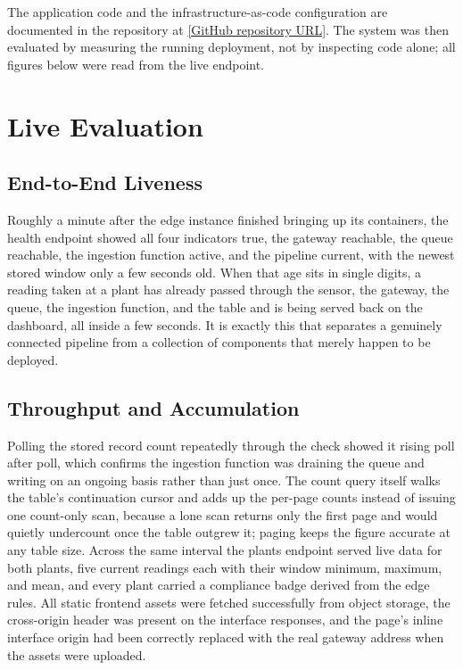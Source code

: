 \documentclass[conference]{IEEEtran}
\begin{document}
The application code and the infrastructure-as-code configuration are documented in the repository at \href{[GitHub repository URL]}{[GitHub repository URL]}. The system was then evaluated by measuring the running deployment, not by inspecting code alone; all figures below were read from the live endpoint.

\section{Live Evaluation}

\subsection{End-to-End Liveness}

Roughly a minute after the edge instance finished bringing up its containers, the health endpoint showed all four indicators true, the gateway reachable, the queue reachable, the ingestion function active, and the pipeline current, with the newest stored window only a few seconds old. When that age sits in single digits, a reading taken at a plant has already passed through the sensor, the gateway, the queue, the ingestion function, and the table and is being served back on the dashboard, all inside a few seconds. It is exactly this that separates a genuinely connected pipeline from a collection of components that merely happen to be deployed.

\subsection{Throughput and Accumulation}

Polling the stored record count repeatedly through the check showed it rising poll after poll, which confirms the ingestion function was draining the queue and writing on an ongoing basis rather than just once. The count query itself walks the table's continuation cursor and adds up the per-page counts instead of issuing one count-only scan, because a lone scan returns only the first page and would quietly undercount once the table outgrew it; paging keeps the figure accurate at any table size. Across the same interval the plants endpoint served live data for both plants, five current readings each with their window minimum, maximum, and mean, and every plant carried a compliance badge derived from the edge rules. All static frontend assets were fetched successfully from object storage, the cross-origin header was present on the interface responses, and the page's inline interface origin had been correctly replaced with the real gateway address when the assets were uploaded.
\end{document}
